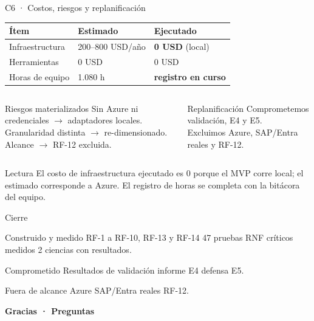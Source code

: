 \documentclass[aspectratio=169,10pt]{beamer}
\newcommand{\good}[1]{\textcolor{GoodGreen}{\textbf{#1}}}
\newcommand{\warn}[1]{\textcolor{WarnAmber}{\textbf{#1}}}
\begin{document}
\begin{frame}{C6 · Costos, riesgos y replanificación}
  \scriptsize
  \begin{tabular}{@{}lll@{}}
    \toprule
    \textbf{Ítem} & \textbf{Estimado} & \textbf{Ejecutado} \\
    \midrule
    Infraestructura & 200--800 USD/año & \good{0 USD} (local) \\
    Herramientas & 0 USD & 0 USD \\
    Horas de equipo & 1.080 h & \warn{registro en curso} \\
    \bottomrule
  \end{tabular}
  \vspace{1.5mm}
  \begin{columns}[T,onlytextwidth]
      \begin{block}{Riesgos materializados}
        Sin Azure ni credenciales $\rightarrow$ adaptadores locales.\\
        Granularidad distinta $\rightarrow$ re-dimensionado.\\
        Alcance $\rightarrow$ RF-12 excluida.
      \end{block}
      \begin{block}{Replanificación}
        Comprometemos validación, E4 y E5.\\
        Excluimos Azure, SAP/Entra reales y RF-12.
      \end{block}
  \end{columns}
  \vspace{1mm}
  \begin{block}{Lectura}
    El costo de infraestructura ejecutado es 0 porque el MVP corre local; el estimado corresponde a Azure.
    El registro de horas se completa con la bitácora del equipo.
  \end{block}
\end{frame}

\begin{frame}{Cierre}
  \begin{block}{Construido y medido}
    RF-1 a RF-10, RF-13 y RF-14 \textbullet{} 47 pruebas \textbullet{} RNF críticos medidos \textbullet{} 2 ciencias con resultados.
  \end{block}
  \begin{block}{Comprometido}
    Resultados de validación \textbullet{} informe E4 \textbullet{} defensa E5.
  \end{block}
  \begin{block}{Fuera de alcance}
    Azure \textbullet{} SAP/Entra reales \textbullet{} RF-12.
  \end{block}
  \vfill
  \centering
  {\Large\color{GascoBlue}\textbf{Gracias · Preguntas}}
\end{frame}
\end{document}
